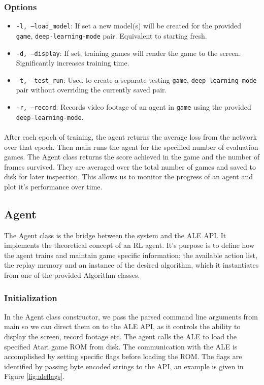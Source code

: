 \subsubsection{Options}
\begin{itemize}
	\item \texttt{-l, ---load\_model}: If set a new model(s) will be created for the provided \texttt{game}, \texttt{deep-learning-mode} pair. Equivalent to starting fresh.
	\item \texttt{-d, ---display}: If set, training games will render the game to the screen. Significantly increases training time.
	\item \texttt{-t, ---test\_run}: Used to create a separate testing \texttt{game}, \texttt{deep-learning-mode} pair without overriding the currently saved pair.
	\item \texttt{-r, ---record}: Records video footage of an agent in \texttt{game} using the provided \texttt{deep-learning-mode}.
\end{itemize} \paragraph{}

After each epoch of training, the agent returns the average loss from the network over that epoch. Then main runs the agent for the specified number of evaluation games. The Agent class returns the score achieved in the game and the number of frames survived. They are averaged over the total number of games and saved to disk for later inspection. This allows us to monitor the progress of an agent and plot it's performance over time.

\subsection{Agent}
The Agent class is the bridge between the system and the ALE API. It implements the theoretical concept of an RL agent. It's purpose is to define how the agent trains and maintain game specific information; the available action list, the replay memory and an instance of the desired algorithm, which it instantiates from one of the provided Algorithm classes.

\subsubsection{Initialization}
In the Agent class constructor, we pass the parsed command line arguments from main so we can direct them on to the ALE API, as it controls the ability to display the screen, record footage etc. The agent calls the ALE to load the specified Atari game ROM from disk. The communication with the ALE is accomplished by setting specific flags before loading the ROM. The flags are identified by passing byte encoded strings to the API, an example is given in Figure \ref{fig:aleflags}.

